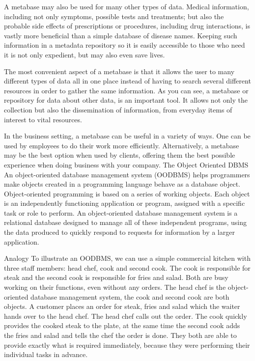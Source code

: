 A metabase may also be used for many other types of data. Medical information, including not only symptoms, possible tests and treatments; but also the probable side effects of prescriptions or procedures, including drug interactions, is vastly more beneficial than a simple database of disease names. Keeping such information in a metadata repository so it is easily accessible to those who need it is not only expedient, but may also even save lives.
 
The most convenient aspect of a metabase is that it allows the user to many different types of data all in one place instead of having to search several different resources in order to gather the same information. As you can see, a metabase or repository for data about other data, is an important tool. It allows not only the collection but also the dissemination of information, from everyday items of interest to vital resources.
 
In the business setting, a metabase can be useful in a variety of ways. One can be used by employees to do their work more efficiently. Alternatively, a metabase may be the best option when used by clients, offering them the best possible experience when doing business with your company.
The Object Oriented DBMS
An object-oriented database management system (OODBMS) helps programmers make objects created in a programming language behave as a database object. Object-oriented programming is based on a series of working objects. Each object is an independently functioning application or program, assigned with a specific task or role to perform. An object-oriented database management system is a relational database designed to manage all of these independent programs, using the data produced to quickly respond to requests for information by a larger application.
 
Analogy
To illustrate an OODBMS, we can use a simple commercial kitchen with three staff members: head chef, cook and second cook. The cook is responsible for steak and the second cook is responsible for fries and salad. Both are busy working on their functions, even without any orders. The head chef is the object-oriented database management system, the cook and second cook are both objects. A customer places an order for steak, fries and salad which the waiter hands over to the head chef. The head chef calls out the order. The cook quickly provides the cooked steak to the plate, at the same time the second cook adds the fries and salad and tells the chef the order is done. They both are able to provide exactly what is required immediately, because they were performing their individual tasks in advance.
 
